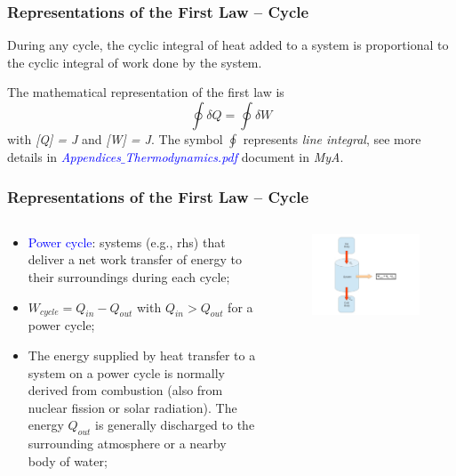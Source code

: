 \documentclass[10pt,compress]{beamer}
\newcommand{\blue}{\textcolor{blue}}
\begin{document}
\begin{frame}
 \frametitle{Representations of the First Law -- Cycle}

 \begin{block}{}During any cycle, the cyclic integral of heat added to a system is proportional to the cyclic integral of work done by the system.\end{block}

 The mathematical representation of the first law is
 \begin{equation}
  \displaystyle\oint \delta Q = \displaystyle\oint \delta W
  \label{Module00:first_law}
 \end{equation}
 with {\it [Q] = J} and {\it [W] = J}. The symbol $\displaystyle\oint$ represents {\it line integral}, see more details in \blue{\it Appendices$\_$Thermodynamics.pdf} document in {\it MyA}.

\end{frame}

\begin{frame}
 \frametitle{Representations of the First Law -- Cycle}
 \begin{columns}
  \begin{column}[l]{0.5\linewidth}
   \begin{itemize}
    \item <1-> \textcolor{blue}{Power cycle}: systems (e.g., rhs) that deliver a net work transfer of energy to their surroundings during each cycle;
    \item <2-> $W_{cycle} = Q_{in} - Q_{out}$ with $Q_{in} > Q_{out}$ for a power cycle;
    \item <3-> The energy supplied by heat transfer to a system on a power cycle is normally derived from combustion (also from nuclear fission or solar radiation). The energy $Q_{out}$ is generally discharged to the surrounding atmosphere or a nearby body of water;
   \end{itemize}
  \end{column}
   
  \begin{column}[l]{0.5\linewidth}
   \begin{figure}%
    \begin{center}
     \includegraphics[width=8.cm,clip]{./../Pics/FirstLaw_Cycle_01}
    \end{center}
   \end{figure}    
  \end{column}
 \end{columns}
 \normalsize
\end{frame}
\end{document}
